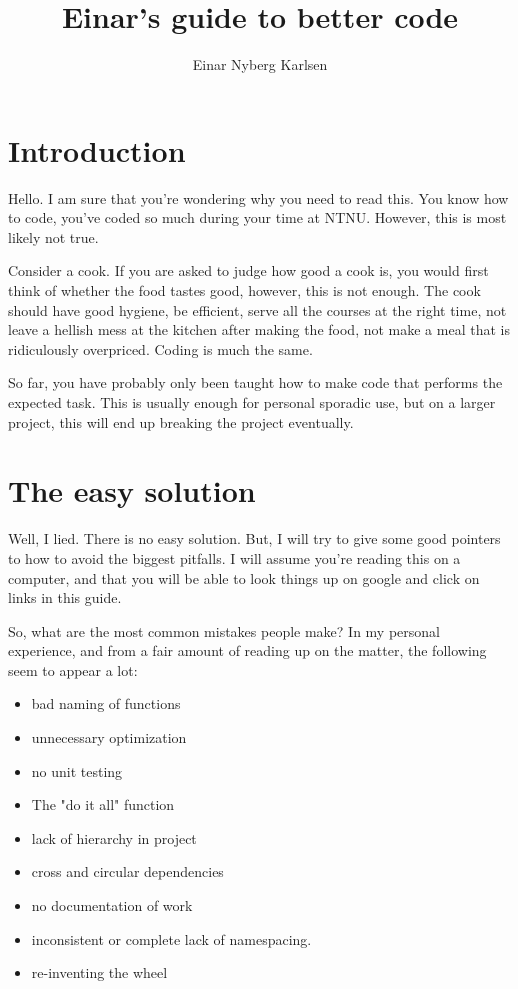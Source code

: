 \documentclass[10pt,a4paper]{article}
\title{Einar's guide to better code}
\author{Einar Nyberg Karlsen}
\begin{document}
\lstset{language=Python}

\section{Introduction}
Hello. I am sure that you're wondering why you need to read this. You know how to code, you've coded so much during your time at NTNU. However, this is most likely not true. 

Consider a cook. If you are asked to judge how good a cook is, you would first think of whether the food tastes good, however, this is not enough. The cook should have good hygiene, be efficient, serve all the courses at the right time, not leave a hellish mess at the kitchen after making the food, not make a meal that is ridiculously overpriced. Coding is much the same. 

So far, you have probably only been taught how to make code that performs the expected task. This is usually enough for personal sporadic use, but on a larger project, this will end up breaking the project eventually.

\section{The easy solution}
Well, I lied. There is no easy solution. But, I will try to give some good pointers to how to avoid the biggest pitfalls. I will assume you're reading this on a computer, and that you will be able to look things up on google and click on links in this guide. 

So, what are the most common mistakes people make? In my personal experience, and from a fair amount of reading up on the matter, the following seem to appear a lot:

\begin{itemize}
\item bad naming of functions
\item unnecessary optimization
\item no unit testing
\item The "do it all" function
\item lack of hierarchy in project
\item cross and circular dependencies
\item no documentation of work
\item inconsistent or complete lack of namespacing.
\item re-inventing the wheel
\end{itemize}
\end{document}
